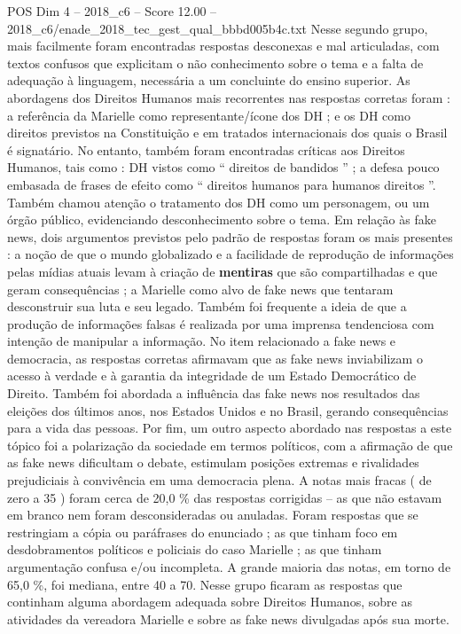 \begin{textsample}{POS Dim 4 – 2018\_c6 – Score 12.00 – 2018\_c6/enade\_2018\_tec\_gest\_qual\_bbbd005b4c.txt}
Nesse segundo grupo, mais facilmente foram encontradas respostas desconexas e mal articuladas, com textos confusos que explicitam o não conhecimento sobre o tema e a falta de adequação à linguagem, necessária a um concluinte do ensino superior.
As abordagens dos Direitos Humanos mais recorrentes nas respostas corretas foram : a referência da Marielle como representante/ícone dos DH ; e os DH como direitos previstos na Constituição e em tratados internacionais dos quais o Brasil é signatário.
No entanto, também foram encontradas críticas aos Direitos Humanos, tais como : DH vistos como “ direitos de bandidos ” ; a defesa pouco embasada de frases de efeito como “ direitos humanos para humanos direitos ”.
Também chamou atenção o tratamento dos DH como um personagem, ou um órgão público, evidenciando desconhecimento sobre o tema.
Em relação às fake news, dois argumentos previstos pelo padrão de respostas foram os mais presentes : a noção de que o mundo globalizado e a facilidade de reprodução de informações pelas mídias atuais levam à criação de \textbf{mentiras} que são compartilhadas e que geram consequências ; a Marielle como alvo de fake news que tentaram desconstruir sua luta e seu legado.
Também foi frequente a ideia de que a produção de informações falsas é realizada por uma imprensa tendenciosa com intenção de manipular a informação.
No item relacionado a fake news e democracia, as respostas corretas afirmavam que as fake news inviabilizam o acesso à verdade e à garantia da integridade de um Estado Democrático de Direito.
Também foi abordada a influência das fake news nos resultados das eleições dos últimos anos, nos Estados Unidos e no Brasil, gerando consequências para a vida das pessoas.
Por fim, um outro aspecto abordado nas respostas a este tópico foi a polarização da sociedade em termos políticos, com a afirmação de que as fake news dificultam o debate, estimulam posições extremas e rivalidades prejudiciais à convivência em uma democracia plena.
A notas mais fracas ( de zero a 35 ) foram cerca de 20,0 \% das respostas corrigidas – as que não estavam em branco nem foram desconsideradas ou anuladas.
Foram respostas que se restringiam a cópia ou paráfrases do enunciado ; as que tinham foco em desdobramentos políticos e policiais do caso Marielle ; as que tinham argumentação confusa e/ou incompleta.
A grande maioria das notas, em torno de 65,0 \%, foi mediana, entre 40 a 70.
Nesse grupo ficaram as respostas que continham alguma abordagem adequada sobre Direitos Humanos, sobre as atividades da vereadora Marielle e sobre as fake news divulgadas após sua morte.

\end{textsample}
